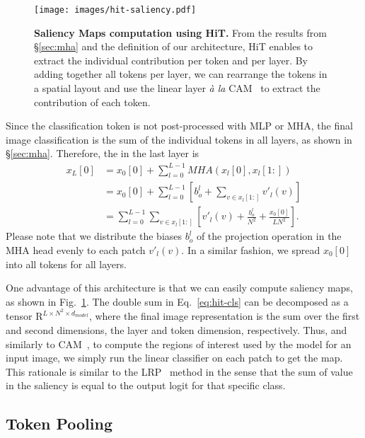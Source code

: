 \begin{figure}[t]
    \centering
    \texttt{[image: images/hit-saliency.pdf]}
    \caption{\textbf{Saliency Maps computation using HiT.} From the results from \S\ref{sec:mha} and the definition of our architecture, HiT enables to extract the individual contribution per token and per layer. By adding together all tokens per layer, we can rearrange the tokens in a spatial layout and use the linear layer \textit{\`a la} CAM~\cite{zhou2016learning} to extract the contribution of each token.}
    \label{fig:hit-saliency}
\end{figure}

Since the classification token is not post-processed with MLP or MHA, the final image classification is the sum of the individual tokens in all layers, as shown in \S\ref{sec:mha}. 
Therefore, the \CLS in the last layer is
\begin{equation}\label{eq:hit-cls}
\begin{split}
    x_L[0] &= x_0[0] + \sum_{l=0}^{L-1} MHA(x_l[0], x_l[1:]) \\
    &= x_0[0] + \sum_{l=0}^{L-1} \left[ b_o^l + \sum_{v\in x_l[1:]} v'_l(v) \right] \\
    &=\sum_{l=0}^{L-1} \sum_{v\in x_l[1:]} \left[v'_l(v) + \frac{b_o^l}{N^2} + \frac{x_0[0]}{LN^2} \right].
\end{split}
\end{equation}
Please note that we distribute the biases $b_o^l$ of the projection operation in the MHA head evenly to each patch $v'_l(v)$. 
In a similar fashion, we spread $x_0[0]$ into all tokens for all layers.

One advantage of this architecture is that we can easily compute saliency maps, as shown in Fig.~\ref{fig:hit-saliency}.
The double sum in Eq.~\ref{eq:hit-cls} can be decomposed as a tensor $\mathrm{R}^{L\times N^2 \times d_{model}}$, where the final image representation is the sum over the first and second dimensions, \ie the layer and token dimension, respectively.
Thus, and similarly to CAM~\cite{zhou2016learning}, to compute the regions of interest used by the model for an input image, we simply run the linear classifier on each patch to get the map.
This rationale is similar to the LRP~\cite{bach2015pixel} method in the sense that the sum of value in the saliency is equal to the output logit for that specific class.

\subsection{Token Pooling}\label{sec:pooling}


